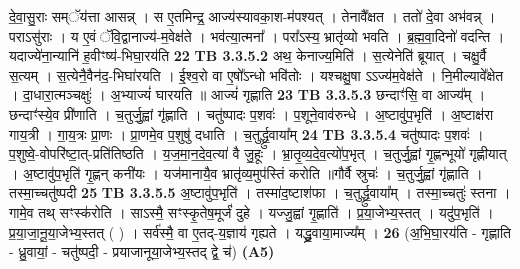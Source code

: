 \documentclass[17pt]{extarticle}
\begin{document}
{{{{{{{{{{{{{{{{{{{                  दे॒वा॒सु॒राः सम्ॅय॑त्ता आसन्न् । स ए॒तमिन्द्र॒ आज्य॑स्यावका॒श-म॑पश्यत् । तेनावै᳚क्षत । ततो॑ दे॒वा अभ॑वन्न् । पराऽसु॑राः । य ए॒वं ॅवि॒द्वानाज्य॑-म॒वेक्ष॑ते । भव॑त्या॒त्मना᳚ । परा᳚ऽस्य॒ भ्रातृ॑व्यो भवति । ब्र॒ह्म॒वा॒दिनो॑ वदन्ति । यदाज्ये॑ना॒न्यानि॑ ह॒वीꣳष्य॑-भिघा॒रय॑ति \textbf{ 22} \newline
                  \newline
                                \textbf{ TB 3.3.5.2} \newline
                  अथ॒ केनाज्य॒मिति॑ । स॒त्येनेति॑ ब्रूयात् । चक्षु॒र्वै स॒त्यम् । स॒त्येनै॒वैन॑द॒-भिघा॑रयति । ई॒श्व॒रो वा ए॒षो᳚ऽन्धो भवि॑तोः । यश्चक्षु॒षा ऽऽज्य॑म॒वेक्ष॑ते । नि॒मील्यावे᳚क्षेत । दा॒धारा॒त्मञ्चक्षुः॑ । अ॒भ्याज्यं॑ घारयति ॥ आज्यं॑ गृह्णाति \textbf{ 23} \newline
                  \newline
                                \textbf{ TB 3.3.5.3} \newline
                  छन्दाꣳ॑सि॒ वा आज्य᳚म् । छन्दाꣳ॑स्ये॒व प्री॑णाति । च॒तुर्जु॒ह्वां गृ॑ह्णाति । चतु॑ष्पादः प॒शवः॑ । प॒शूने॒वाव॑रुन्धे । अ॒ष्टावु॑प॒भृति॑ । अ॒ष्टाक्ष॑रा गाय॒त्री । गा॒य॒त्रः प्रा॒णः । प्रा॒णमे॒व प॒शुषु॑ दधाति । च॒तुर्द्ध्रु॒वाया᳚म् \textbf{ 24} \newline
                  \newline
                                \textbf{ TB 3.3.5.4} \newline
                  चतु॑ष्पादः प॒शवः॑ । प॒शुष्वे॒-वोपरि॑ष्टा॒त्-प्रति॑तिष्ठति । य॒ज॒मा॒न॒दे॒व॒त्या॑ वै जु॒हूः । भ्रा॒तृ॒व्य॒दे॒व॒त्यो॑प॒भृत् । च॒तुर्जु॒ह्वां गृ॒ह्णन्भूयो॑ गृह्णीयात् । अ॒ष्टावु॑प॒भृति॑ गृ॒ह्णन् कनी॑यः । यज॑मानायै॒व भ्रातृ॑व्य॒मुप॑स्तिं करोति ॥गौर्वै स्रुचः॑ । च॒तुर्जु॒ह्वां गृ॑ह्णाति । तस्मा॒च्चतु॑ष्पदी \textbf{ 25} \newline
                  \newline
                                \textbf{ TB 3.3.5.5} \newline
                  अ॒ष्टावु॑प॒भृति॑ । तस्मा॑द॒ष्टाश॑फा । च॒तुर्द्ध्रु॒वाया᳚म् । तस्मा॒च्चतुः॑ स्तना । गामे॒व तथ् सꣳस्क॑रोति । साऽस्मै॒ सꣳस्कृ॒तेष॒मूर्जं॑ दुहे । यज्जु॒ह्वां गृ॒ह्णाति॑ । प्र॒या॒जेभ्य॒स्तत् । यदु॑प॒भृति॑ । प्र॒या॒जा॒नू॒या॒जेभ्य॒स्तत् ( ) । सर्व॑स्मै॒ वा ए॒तद्-य॒ज्ञाय॑ गृह्यते । यद्ध्रु॒वाया॒माज्य᳚म् । \textbf{ 26} \newline
                  \newline
                                    (अ॒भि॒घा॒रय॑ति - गृह्णाति - ध्रु॒वायां॒ - चतु॑ष्पदी॒ - प्रयाजानूया॒जेभ्य॒स्तद् द्वे॒ च॑) \textbf{(A5)} \newline \newline
}}}}}}}}}}}}}}}}}}}
\end{document}
